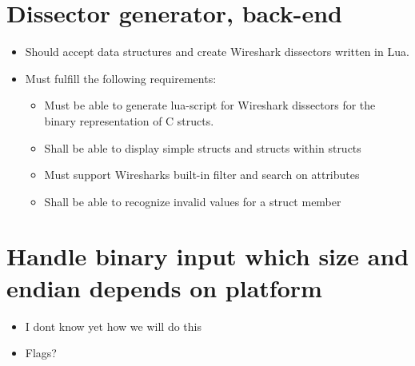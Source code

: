 \section{Dissector generator, back-end}
\begin{itemize}
	\item Should accept data structures and create Wireshark dissectors written in Lua.
	\item Must fulfill the following requirements: 
	\begin{itemize}
		\item Must be able to generate lua-script for Wireshark dissectors for the binary representation of C structs.
		\item Shall be able to display simple structs and structs within structs
		\item Must support Wiresharks built-in filter and search on attributes
		\item Shall be able to recognize invalid values for a struct member
	\end{itemize}
\end{itemize}

\section{Handle binary input which size and endian depends on platform}
\begin{itemize}
	\item I dont know yet how we will do this
	\item Flags?
\end{itemize}